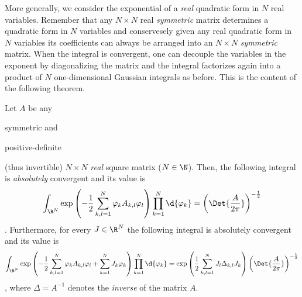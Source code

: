 More generally, we consider the exponential of a \emph{real} quadratic form in
$N$ real variables.
Remember that any $N\times N$  real \emph{symmetric} matrix determines a
quadratic form in $N$ variables and conservesely given any real quadratic form
in $N$ variables its coefficients can always be arranged into an $N\times N$
\emph{symmetric} matrix.
When the integral is convergent, one can decouple the variables in the exponent
by diagonalizing the matrix and
the integral factorizes again into a product of $N$ one-dimensional
Gaussian integrals as before. This is the content of the following theorem.
\begin{theorem}
   Let $A$ be any 
   \begin{inparaenum}[a)]
      \item symmetric and 
      \item positive-definite 
   \end{inparaenum}
   (thus invertible) $N\times N$ \emph{real} square matrix 
   ($N\in\N$). 
   Then, the following integral is
   \emph{absolutely} convergent and its
   value is
   \begin{dmath}[label={piA}]
      \int_{\R^{N}} \exp{\left( -\frac{1}{2} \sum_{k,l=1}^{N} \varphi_{k} A_{k,l}
	    \varphi_{l} \right)} \prod_{k=1}^{N} \d{\varphi_{k}} = \left( \Det{ \frac{A}{2\pi}}
      \right)^{-\frac{1}{2}} 
   \end{dmath}.
   Furthermore, for every $J \in \R^{N}$ the following integral is
   absolutely convergent and its value is 
   \begin{dmath}[label={piAJ}]
      \int_{\R^{N}} \exp{\left( -\frac{1}{2} \sum_{k,l=1}^{N} \varphi_{k} A_{k,l}
	    \varphi_{l} + \sum_{k=1}^{N} J_{k} \varphi_{k}\right)}  \prod_{k=1}^{N}
      \d{\varphi_{k}} =
      \exp{\left( \frac{1}{2} \sum_{k,l=1}^{N} J_{l} \Delta_{k,l} J_{k} \right)
      }\left( \Det{ \frac{A}{2\pi}}
      \right)^{-\frac{1}{2}} 
   \end{dmath},
   where $\Delta = A^{-1}$ denotes the \emph{inverse} of the matrix $A$.
\end{theorem}

